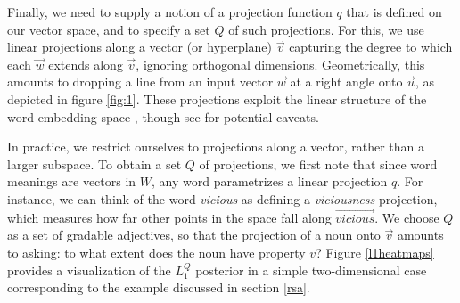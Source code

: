 \documentclass[9pt,twocolumn,twoside,lineno]{pnas-new}
\newcommand{\Listener}{L}
\newcommand{\QLONE}{\Listener_{{1}}^{{Q}}}
\begin{document}
		Finally, we need to supply a notion of a projection function $q$ that is defined on our vector space, and to specify a set $Q$ of such projections. 
		For this, we use linear projections
		along a vector (or hyperplane) $\overrightarrow{v}$ 
		capturing the degree to which each $\overrightarrow{w}$ extends along $\overrightarrow{v}$, ignoring orthogonal dimensions. Geometrically, this amounts to dropping a line from an input vector $\overrightarrow{w}$ at a right angle onto $\overrightarrow{u}$, as depicted in figure \ref{fig:1}. These projections exploit the linear structure of the word embedding space \cite{pennington2014glove}, though see \cite{linzen2016issues,finley2017analogies} for potential caveats.



		In practice, we restrict ourselves to projections along a vector, rather than a larger subspace. 
		To obtain a set $Q$ of projections, we first note that since word meanings are vectors in $W$, any word parametrizes a linear projection $q$. For instance, we can think of the word \emph{vicious} as defining a \emph{viciousness} projection, which measures how far other points in the space fall along $\overrightarrow{\mathit{vicious}}$. 
		We choose $Q$ as a set of gradable adjectives, so that the projection of a noun onto $\overrightarrow{v}$ amounts to asking: to what extent does the noun have property $v$? 
		Figure \ref{l1heatmaps} provides a visualization of the $\QLONE$ posterior in a simple two-dimensional case corresponding to the example discussed in section \ref{rsa}.
\end{document}
